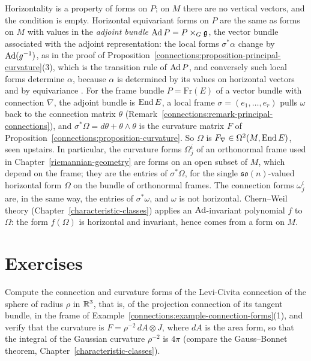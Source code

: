 \begin{remark}\label{connections:remark-curvature-horizontal}
Horizontality is a property of forms on $P$; on $M$ there are no vertical vectors, and the condition is empty. Horizontal equivariant forms on $P$ are the same as forms on $M$ with values in the
\emph{adjoint bundle} $\operatorname{Ad} P = P \times_G \mathfrak{g}$, the vector bundle associated with the adjoint representation: the local forms $\sigma^*\alpha$ change by $\operatorname{Ad}(g^{-1})$, as in the proof of
Proposition~\ref{connections:proposition-principal-curvature}(3), which is the transition rule of $\operatorname{Ad} P$, and conversely such local forms determine $\alpha$, because $\alpha$ is determined by its values on
horizontal vectors and by equivariance \cite[Chapter II, \S5]{kobayashi-nomizu}. For the frame bundle $P = \mathrm{Fr}(E)$ of a vector bundle with connection $\nabla$, the adjoint bundle is $\operatorname{End} E$, a local
frame $\sigma = (e_1, \ldots, e_r)$ pulls $\omega$ back to the connection matrix $\theta$ (Remark~\ref{connections:remark-principal-connections}), and $\sigma^*\Omega = d\theta + \theta \wedge \theta$ is the
curvature matrix $F$ of Proposition~\ref{connections:proposition-curvature}. So $\Omega$ is $F_\nabla \in \Omega^2(M, \operatorname{End} E)$, seen upstairs. In particular, the curvature forms $\Omega^i_j$ of an orthonormal
frame used in Chapter~\ref{riemannian-geometry} are forms on an open subset of $M$, which depend on the frame; they are the entries of $\sigma^*\Omega$, for the single $\mathfrak{so}(n)$-valued horizontal form
$\Omega$ on the bundle of orthonormal frames. The connection forms $\omega^i_j$ are, in the same way, the entries of $\sigma^*\omega$, and $\omega$ is not horizontal. Chern--Weil theory
(Chapter~\ref{characteristic-classes}) applies an $\operatorname{Ad}$-invariant polynomial $f$ to $\Omega$: the form $f(\Omega)$ is horizontal and invariant, hence comes from a form on $M$.
\end{remark}

\section{Exercises}\label{connections:section-exercises}

\begin{exercise}\label{connections:exercise-curvature-sphere}
Compute the connection and curvature forms of the Levi-Civita connection of the sphere of radius $\rho$ in $\mathbb{R}^3$, that is, of the projection connection of its tangent
bundle, in the frame of Example~\ref{connections:example-connection-forms}(1), and verify that the curvature is $F = \rho^{-2}\,dA \otimes J$, where $dA$ is the area form, so that
the integral of the Gaussian curvature $\rho^{-2}$ is $4\pi$ (compare the Gauss--Bonnet theorem, Chapter~\ref{characteristic-classes}).
\end{exercise}

